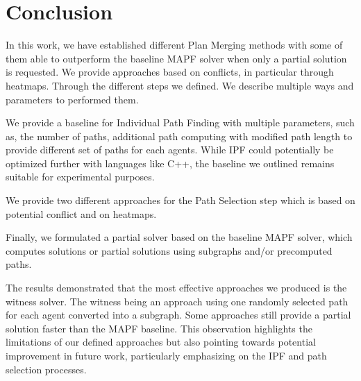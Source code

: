 \section{Conclusion}

In this work, we have established different Plan Merging methods with some of them able to outperform the baseline MAPF solver when only a partial solution is requested. We provide approaches based on conflicts, in particular through heatmaps. Through the different steps we defined. We describe multiple ways and parameters to performed them.

We provide a baseline for Individual Path Finding with multiple parameters, such as, the number of paths, additional path computing with modified path length to provide different set of paths for each agents. While IPF could potentially be optimized further with languages like C++, the baseline we outlined remains suitable for experimental purposes.

We provide two different approaches for the Path Selection step which is based on potential conflict and on heatmaps.

Finally, we formulated a partial solver based on the baseline MAPF solver, which computes solutions or partial solutions using subgraphs and/or precomputed paths.

The results demonstrated that the most effective approaches we produced is the witness solver. The witness being an approach using one randomly selected path for each agent converted into a subgraph. Some approaches still provide a partial solution faster than the MAPF baseline. This observation highlights the limitations of our defined approaches but also pointing towards potential improvement in future work, particularly emphasizing on the IPF and path selection processes.